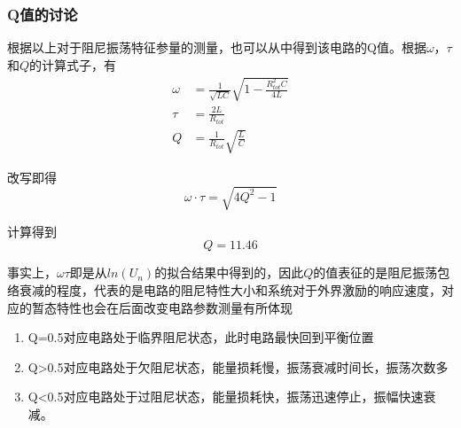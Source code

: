 \documentclass[12pt]{article}
\begin{document}
\subsubsection{Q值的讨论}
\quad 根据以上对于阻尼振荡特征参量的测量，也可以从中得到该电路的Q值。根据$\omega$，$\tau$和$Q$的计算式子，有
\begin{equation*}
\begin{aligned}
    \omega &= \frac {1}{\sqrt{LC}}\sqrt{1-\frac{R_{tot}^2C}{4L}}\\
    \tau &= \frac {2L}{R_{tot}}\\
    Q &= \frac{1}{R_{tot}}\sqrt{\frac{L}{C}}
\end{aligned}
\end{equation*}
\par
改写即得
\[
    \omega \cdot \tau=\sqrt{4Q^2-1}
\]
\par
计算得到\\
\begin{equation}
    Q=11.46
\end{equation}
\par
事实上，$\omega\tau$即是从$ln(U_n)$的拟合结果中得到的，因此$Q$的值表征的是阻尼振荡包络衰减的程度，代表的是电路的阻尼特性大小和系统对于外界激励的响应速度，对应的暂态特性也会在后面改变电路参数测量有所体现
\begin{enumerate}
    \item Q=0.5对应电路处于临界阻尼状态，此时电路最快回到平衡位置
    \item Q>0.5对应电路处于欠阻尼状态，能量损耗慢，振荡衰减时间长，振荡次数多
    \item Q<0.5对应电路处于过阻尼状态，能量损耗快，振荡迅速停止，振幅快速衰减。
\end{enumerate}
\end{document}
